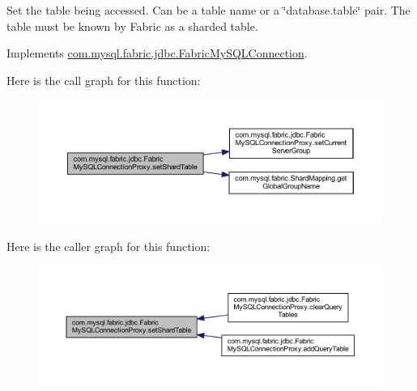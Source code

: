 Set the table being accessed. Can be a table name or a \char`\"{}database.\+table\char`\"{} pair. The table must be known by Fabric as a sharded table. 

Implements \mbox{\hyperlink{interfacecom_1_1mysql_1_1fabric_1_1jdbc_1_1_fabric_my_s_q_l_connection_a5e9287d2536bd36fcc2f63d8a27a6b9b}{com.\+mysql.\+fabric.\+jdbc.\+Fabric\+My\+S\+Q\+L\+Connection}}.

Here is the call graph for this function\+:\nopagebreak
\begin{figure}[H]
\begin{center}
\leavevmode
\includegraphics[width=350pt]{classcom_1_1mysql_1_1fabric_1_1jdbc_1_1_fabric_my_s_q_l_connection_proxy_a3dd3f50c8de7678f002bae64114643c3_cgraph}
\end{center}
\end{figure}
Here is the caller graph for this function\+:\nopagebreak
\begin{figure}[H]
\begin{center}
\leavevmode
\includegraphics[width=350pt]{classcom_1_1mysql_1_1fabric_1_1jdbc_1_1_fabric_my_s_q_l_connection_proxy_a3dd3f50c8de7678f002bae64114643c3_icgraph}
\end{center}
\end{figure}
\mbox{\label{classcom_1_1mysql_1_1fabric_1_1jdbc_1_1_fabric_my_s_q_l_connection_proxy_a43c6bfeee4fadd1086af9e956ef658cf}} 
